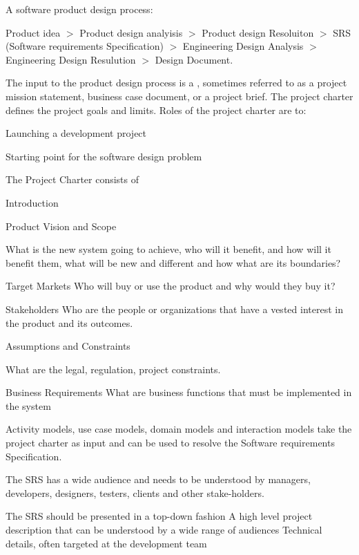 \begin{compactitem}
\item A software product design process:

Product idea $>$ Product design analyisis $>$ Product design Resoluiton $>$ SRS (Software requirements Specification) $>$ Engineering Design Analysis $>$ Engineering Design Resulution $>$ Design Document. 

\item The input to the product design process is a , sometimes referred to as a project mission statement, business case document, or a project brief.
The project charter defines the project goals and limits.
Roles of the project charter are to:
\begin{compactitem}
\item Launching a development project
\item Starting point for the software design problem
\end{compactitem}
The Project Charter consists of
\begin{compactitem}
\item Introduction 
\item Product Vision and Scope
\item What is the new system going to achieve, who will it benefit, and how will it benefit them, what will be new and different and how what are its boundaries?
\item Target Markets
Who will buy or use the product and why would they buy it?
\item Stakeholders
Who are the people or organizations that have a vested interest in the product and its outcomes.
\item Assumptions and  Constraints
\item What are the legal, regulation, project constraints.
\item Business Requirements
What are business functions that must be implemented in the system
\end{compactitem}

\item Activity models, use case models, domain models and interaction models take the project charter as input and can be used to resolve the Software requirements Specification. 

\item The SRS has a wide audience and needs to be understood by  managers, developers, designers, testers, clients and other stake-holders.
\item The SRS should be presented in a top-down fashion
A high level project description that can be understood by a wide range of audiences
Technical details, often targeted at the development team


\end{compactitem}

